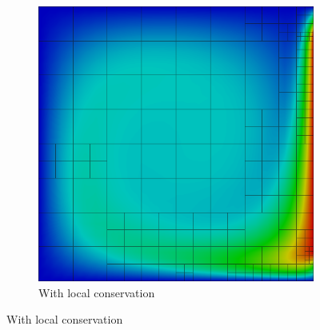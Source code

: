 \documentclass[mathserif]{beamer}
\begin{document}
\begin{frame}
{\begin{figure}
\begin{subfigure}[t]{0.49\textwidth}
\includegraphics[width=1.0\textwidth]{../figs/DoubleGlazing/robust6c.png}
\caption*{With local conservation}
\end{subfigure}
\end{figure}
}
\end{frame}

\end{document}
